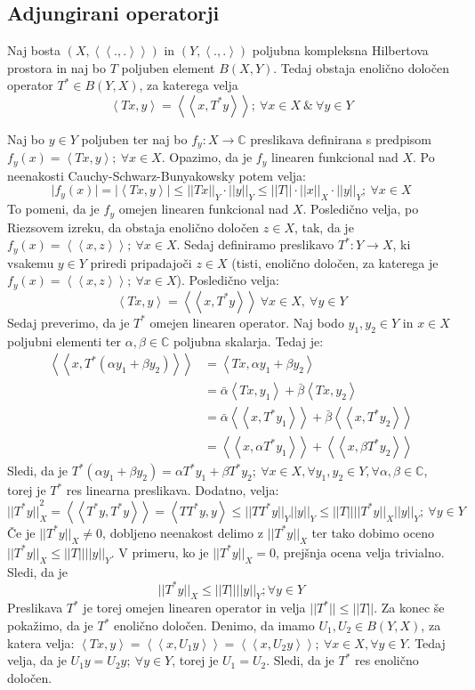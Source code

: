 \documentclass[mat2]{matdelo}
\newcommand{\C}{\mathbb{C}}
\newcommand{\abs}[1]{\ensuremath{\lvert #1 \rvert}}
\newcommand{\norm}[1]{\abs{\abs{#1}}}
\newcommand{\Sp}[2]{\ensuremath{\left<#1, #2\right>}}
\newcommand{\Spp}[2]{\ensuremath{\left<\left<#1, #2\right>\right>}}
\newcommand{\map}[3]{\ensuremath{{#1}:{#2}\rightarrow{#3}}}
\begin{document}
		\subsection{Adjungirani operatorji}
			\begin{izrek}
				\label{izr:Adjexist}
				Naj bosta $(X, \Spp{.}{.})$ in $(Y, \Sp{.}{.})$ poljubna kompleksna Hilbertova prostora in naj bo $T$ poljuben element $B(X, Y)$. Tedaj obstaja enolično določen operator $T^*\in B(Y, X)$, za katerega velja $$\Sp{Tx}{y} = \Spp{x}{T^*y};~\forall x\in X~\&~\forall y \in Y $$
			\end{izrek}
			\begin{dokaz}
				Naj bo $y\in Y$ poljuben ter naj bo $\map{f_y}{X}{\C}$ preslikava definirana s predpisom $f_y(x) = \Sp{Tx}{y};~\forall x\in X$. Opazimo, da je $f_y$ linearen funkcional nad $X$. Po neenakosti Cauchy-Schwarz-Bunyakowsky potem velja: $$\abs{f_y(x)} = \abs{\Sp{Tx}{y}} \leq \norm{Tx}_Y \cdot \norm{y}_Y \leq \norm{T}\cdot\norm{x}_X\cdot\norm{y}_Y;~ \forall x\in X$$ To pomeni, da je $f_y$ omejen linearen funkcional nad $X$. Posledično velja, po Riezsovem izreku, da obstaja enolično določen $z\in X$, tak, da je $f_y(x) = \Spp{x}{z};~\forall x\in X$. Sedaj definiramo preslikavo $\map{T^*}{Y}{X}$, ki vsakemu $y\in Y$ priredi pripadajoči $z\in X$ (tisti, enolično določen, za katerega je $f_y(x) = \Spp{x}{z};~\forall x\in X$). Posledično velja: $$\Sp{Tx}{y}=\Spp{x}{T^*y}~\forall x\in X,~\forall y\in Y$$
				Sedaj preverimo, da je $T^*$ omejen linearen operator. Naj bodo $y_1, y_2 \in Y$ in $x\in X$ poljubni elementi ter $\alpha, \beta \in \C$ poljubna skalarja. Tedaj je: \begin{align*}
					\Spp{x}{T^*(\alpha y_1 + \beta y_2)} &= \Sp{Tx}{\alpha y_1 + \beta y_2} \\
					&= \bar{\alpha}\Sp{Tx}{y_1} + \bar{\beta}\Sp{Tx}{y_2} \\
					&= \bar{\alpha}\Spp{x}{T^*y_1} + \bar{\beta}\Spp{x}{T^*y_2} \\
					&= \Spp{x}{\alpha T^*y_1} + \Spp{x}{\beta T^*y_2}
				\end{align*}
				Sledi, da je $T^*(\alpha y_1 + \beta y_2)=\alpha T^*y_1 + \beta T^*y_2;~\forall x\in X, \forall y_1, y_2 \in Y, \forall \alpha, \beta \in \C$, torej je $T^*$ res linearna preslikava. Dodatno, velja: $$\norm{T^*y}_X^2 = \Spp{T^*y}{T^*y} = \Sp{TT^*y}{y} \leq \norm{TT^*y}_Y\norm{y}_Y \leq \norm{T}\norm{T^*y}_X\norm{y}_Y;~\forall y\in Y$$
				Če je $\norm{T^*y}_X \neq 0$, dobljeno neenakost delimo z $\norm{T^*y}_X$ ter tako dobimo oceno $\norm{T^*y}_X \leq \norm{T}\norm{y}_Y$. V primeru, ko je $\norm{T^*y}_X = 0$, prejšnja ocena velja trivialno. Sledi, da je $$\norm{T^*y}_X \leq \norm{T}\norm{y}_Y; \forall y\in Y$$
				Preslikava $T^*$ je torej omejen linearen operator in velja $\norm{T^*}\leq \norm{T}$. Za konec še pokažimo, da je $T^*$ enolično določen. Denimo, da imamo $U_1, U_2 \in B(Y, X)$, za katera velja: $\Sp{Tx}{y} = \Spp{x}{U_1 y} = \Spp{x}{U_2 y};~\forall x\in X, \forall y\in Y$. Tedaj velja, da je $U_1y = U_2y;~\forall y\in Y$, torej je $U_1 = U_2$. Sledi, da je $T^*$ res enolično določen.
			\end{dokaz}
\end{document}
